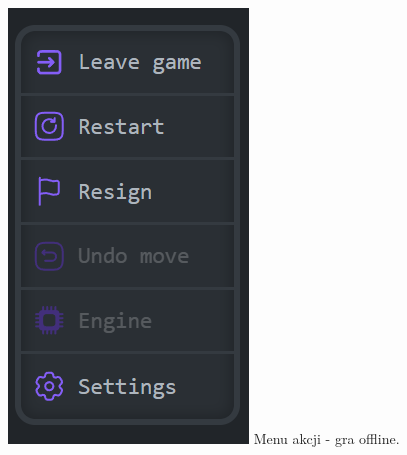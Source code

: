\documentclass[12pt,a4paper]{article}
\begin{document}
\begin{minipage}[t]{0.2\textwidth} 
    \vspace{0pt} 
    \centering 
    \includegraphics[width=\linewidth]{images/ins_min_eopt.png} 
    Menu akcji - gra offline.
\end{minipage}

\vspace{1cm}
\end{document}
